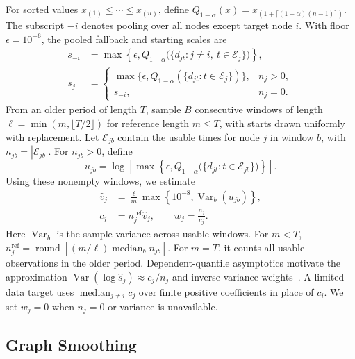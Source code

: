 \documentclass[conference]{IEEEtran}
\begin{document}
For sorted values $x_{(1)}\leq\cdots\leq x_{(n)}$, define $Q_{1-\alpha}(x)=x_{(1+\lceil(1-\alpha)(n-1)\rceil)}$. The subscript $-i$ denotes pooling over all nodes except target node $i$. With floor $\epsilon=10^{-6}$, the pooled fallback and starting scales are
\begin{equation}
\begin{aligned}
s_{-i}&=\max\!\left\{\epsilon,Q_{1-\alpha}\bigl(\{d_{jt}:j\ne i,\ t\in\mathcal E_j\}\bigr)\right\},\\
s_j&=\begin{cases}
\max\{\epsilon,Q_{1-\alpha}(\{d_{jt}:t\in\mathcal E_j\})\}, & n_j>0,\\
s_{-i}, & n_j=0.
\end{cases}
\end{aligned}
\label{eq:starting-scales}
\end{equation}
From an older period of length $T$, sample $B$ consecutive windows of length $\ell=\min(m,\lfloor T/2\rfloor)$ for reference length $m\leq T$, with starts drawn uniformly with replacement. Let $\mathcal E_{jb}$ contain the usable times for node $j$ in window $b$, with $n_{jb}=|\mathcal E_{jb}|$. For $n_{jb}>0$, define
\begin{equation*}
u_{jb}=\log\!\left[\max\!\left\{\epsilon,Q_{1-\alpha}\bigl(\{d_{jt}:t\in\mathcal E_{jb}\}\bigr)\right\}\right].
\end{equation*}
Using these nonempty windows, we estimate
\begin{equation}
\begin{aligned}
\hat v_j&=\frac{\ell}{m}\max\!\left\{10^{-8},\operatorname{Var}_{b}(u_{jb})\right\},\\
c_j&=n_j^{\mathrm{ref}}\hat v_j,\qquad w_j=\frac{n_j}{c_j}.
\end{aligned}
\label{eq:precision-weights}
\end{equation}
Here $\operatorname{Var}_{b}$ is the sample variance across usable windows. For $m<T$, $n_j^{\mathrm{ref}}=\operatorname{round}[(m/\ell)\operatorname{median}_{b}n_{jb}]$. For $m=T$, it counts all usable observations in the older period. Dependent-quantile asymptotics motivate the approximation $\operatorname{Var}(\log\hat s_j)\approx c_j/n_j$ and inverse-variance weights~\cite{wu2005bahadur}. A limited-data target uses $\operatorname{median}_{j\ne i}c_j$ over finite positive coefficients in place of $c_i$. We set $w_j=0$ when $n_j=0$ or variance is unavailable.

\subsection{Graph Smoothing}
\end{document}

